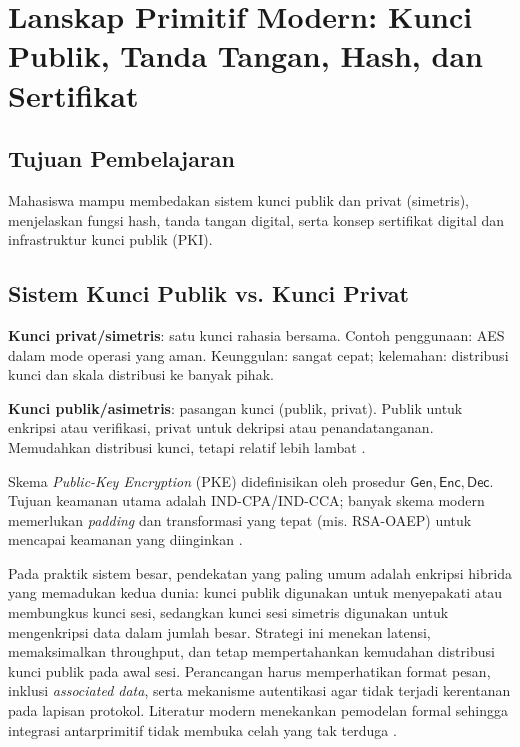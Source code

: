 \documentclass[../main.tex]{subfiles}
\begin{document}
\chapter{Lanskap Primitif Modern: Kunci Publik, Tanda Tangan, Hash, dan Sertifikat}

\section{Tujuan Pembelajaran}
Mahasiswa mampu membedakan sistem kunci publik dan privat (simetris), menjelaskan fungsi hash, tanda tangan digital, serta konsep sertifikat digital dan infrastruktur kunci publik (PKI).

\section{Sistem Kunci Publik vs. Kunci Privat}
\textbf{Kunci privat/simetris}: satu kunci rahasia bersama. Contoh penggunaan: AES dalam mode operasi yang aman. Keunggulan: sangat cepat; kelemahan: distribusi kunci dan skala distribusi ke banyak pihak.

\textbf{Kunci publik/asimetris}: pasangan kunci (publik, privat). Publik untuk enkripsi atau verifikasi, privat untuk dekripsi atau penandatanganan. Memudahkan distribusi kunci, tetapi relatif lebih lambat \citep{katzlindell,stallings}.

\begin{definition}
Skema \emph{Public-Key Encryption} (PKE) didefinisikan oleh prosedur \(\mathsf{Gen},\mathsf{Enc},\mathsf{Dec}\). Tujuan keamanan utama adalah IND-CPA/IND-CCA; banyak skema modern memerlukan \emph{padding} dan transformasi yang tepat (mis. RSA-OAEP) untuk mencapai keamanan yang diinginkan \citep{rfc8017,katzlindell}.
\end{definition}

Pada praktik sistem besar, pendekatan yang paling umum adalah enkripsi hibrida yang memadukan kedua dunia: kunci publik digunakan untuk menyepakati atau membungkus kunci sesi, sedangkan kunci sesi simetris digunakan untuk mengenkripsi data dalam jumlah besar. Strategi ini menekan latensi, memaksimalkan throughput, dan tetap mempertahankan kemudahan distribusi kunci publik pada awal sesi. Perancangan harus memperhatikan format pesan, inklusi \emph{associated data}, serta mekanisme autentikasi agar tidak terjadi kerentanan pada lapisan protokol. Literatur modern menekankan pemodelan formal sehingga integrasi antarprimitif tidak membuka celah yang tak terduga \citep{katzlindell,bonehshoup}.
\end{document}
